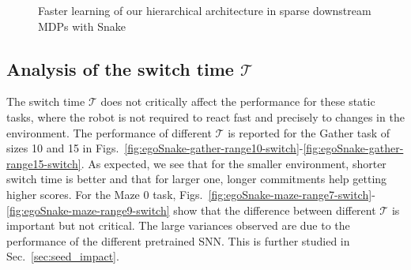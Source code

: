 \documentclass{article} %
\begin{document}
\begin{figure}[h!]
	\centering
	\caption{Faster learning of our hierarchical architecture in sparse downstream MDPs with Snake}
	\label{fig:egoSnake-learning-curves}
\end{figure}

\subsection{Analysis of the switch time $\mathcal{T}$}
\label{sec:switch_time}
The switch time $\mathcal{T}$ does not critically affect the performance for these static tasks, where the robot is not required to react fast and precisely to changes in the environment. The performance of different $\mathcal{T}$ is reported for the Gather task of sizes 10 and 15 in Figs.\ \ref{fig:egoSnake-gather-range10-switch}-\ref{fig:egoSnake-gather-range15-switch}. As expected, we see that for the smaller environment, shorter switch time is better and that for larger one, longer commitments help getting higher scores. For the Maze 0 task, Figs.\ \ref{fig:egoSnake-maze-range7-switch}-\ref{fig:egoSnake-maze-range9-switch} show that the difference between different $\mathcal{T}$ is important but not critical. The large variances observed are due to the performance of the different pretrained SNN. This is further studied in Sec.\ \ref{sec:seed_impact}.
\end{document}
